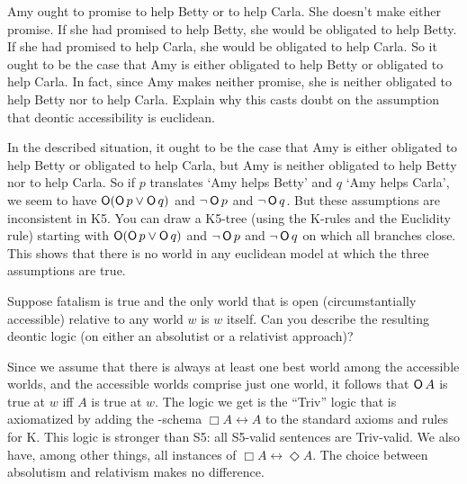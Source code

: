 \begin{exercise}\label{ex:amybettycarla}
  Amy ought to promise to help Betty or to help Carla. She doesn't make either
  promise. If she had promised to help Betty, she would be obligated to help
  Betty. If she had promised to help Carla, she would be obligated to help
  Carla. So it ought to be the case that Amy is either obligated to help Betty
  or obligated to help Carla. In fact, since Amy makes neither promise, she is
  neither obligated to help Betty nor to help Carla. Explain why this casts
  doubt on the assumption that deontic accessibility is euclidean.
\end{exercise}
\begin{solution}
  In the described situation, it ought to be the case that Amy is either
  obligated to help Betty or obligated to help Carla, but Amy is neither
  obligated to help Betty nor to help Carla. So if $p$ translates `Amy helps
  Betty' and $q$ `Amy helps Carla', we seem to have $\operatorname{\mathsf{O}}(\operatorname{\mathsf{O}} p \lor \operatorname{\mathsf{O}} q)$ and
  $\neg \operatorname{\mathsf{O}} p$ and $\neg \operatorname{\mathsf{O}} q$. But these assumptions are inconsistent in K5.
  You can draw a K5-tree (using the K-rules and the Euclidity rule) starting
  with $\operatorname{\mathsf{O}}(\operatorname{\mathsf{O}} p \lor \operatorname{\mathsf{O}} q)$ and $\neg \operatorname{\mathsf{O}} p$ and $\neg \operatorname{\mathsf{O}} q$ on which all
  branches close. This shows that there is no world in any euclidean model at
  which the three assumptions are true.

\end{solution}

\begin{exercise}
  Suppose fatalism is true and the only world that is open (circumstantially
  accessible) relative to any world $w$ is $w$ itself. Can you describe the
  resulting deontic logic (on either an absolutist or a relativist approach)?
\end{exercise}
\begin{solution}
  Since we assume that there is always at least one best world among the
  accessible worlds, and the accessible worlds comprise just one world, it
  follows that $\operatorname{\mathsf{O}} A$ is true at $w$ iff $A$ is true at $w$. The logic we get
  is the ``Triv'' logic that is axiomatized by adding the -schema
  $\Box A \leftrightarrow A$ to the standard axioms and rules for K. This logic
  is stronger than S5: all S5-valid sentences are Triv-valid. We also have,
  among other things, all instances of $\Box A \leftrightarrow \Diamond A$. The
  choice between absolutism and relativism makes no difference.
\end{solution}

